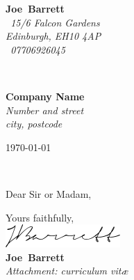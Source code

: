 \documentclass{article}
\def\firstname{Joe}
\def\surname{Barrett}
\def\address{\faMapMarker~15/6 Falcon Gardens\\Edinburgh, EH10 4AP\\}
\def\phone{\faMobilePhone~07706926045}
\def\FileAuthor{\firstname\ \surname}
\def\compName{Company Name}
\def\compAddress{Number and street\\city, postcode}
\begin{document}
	\hfill%
\begin{minipage}[t]{.6\textwidth}
	\raggedleft%
	{\bfseries \FileAuthor}\\[.35ex]
	\small\itshape%
	\address[.35ex]
	\phone\\

\end{minipage}\\[1em]
%
\begin{minipage}[t]{.4\textwidth}
	\raggedright%
	{\bfseries \compName}\\[.35ex]
	\small\itshape%
	\compAddress
\end{minipage}
\hfill
\begin{minipage}[t]{.4\textwidth}
	\hfill
	\raggedleft
	\today
\end{minipage}\\[2em]
\raggedright
Dear Sir or Madam,\\[1.5em]
%
\kant[1-3]

Yours faithfully,\\[2em] %
%
\includegraphics{../sig.png}\\
{\bfseries \FileAuthor}\\
%
\vfill%
{\slshape Attachment: curriculum vit\ae{}}
\end{document}
